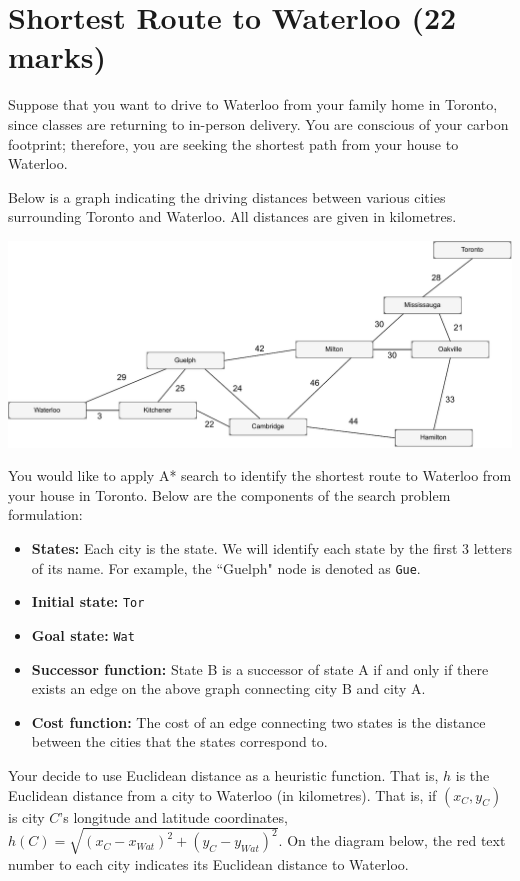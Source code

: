 \documentclass[12pt]{article}
\begin{document}
\newpage
\section{Shortest Route to Waterloo (22 marks)}

Suppose that you want to drive to Waterloo from your family home in Toronto, since classes are returning to in-person delivery. You are conscious of your carbon footprint; therefore, you are seeking the shortest path from your house to Waterloo.

Below is a graph indicating the driving distances between various cities surrounding Toronto and Waterloo. All distances are given in kilometres.

\includegraphics[width=\textwidth]{images_posted/Distance_map.pdf}

You would like to apply A* search to identify the shortest route to Waterloo from your house in Toronto. Below are the components of the search problem formulation:

\begin{itemize}
    \item \textbf{States:} Each city is the state. We will identify each state by the first 3 letters of its name. For example, the ``Guelph" node is denoted as \texttt{Gue}.
    \item \textbf{Initial state:} \texttt{Tor}
    \item \textbf{Goal state:} \texttt{Wat}
    \item \textbf{Successor function:} State B is a successor of state A if and only if there exists an edge on the above graph connecting city B and city A.
    \item \textbf{Cost function:} The cost of an edge connecting two states is the distance between the cities that the states correspond to.
\end{itemize}


Your decide to use Euclidean distance as a heuristic function. That is, $h$ is the Euclidean distance from a city to Waterloo (in kilometres). That is, if $(x_C,y_C)$ is city $C$'s longitude and latitude coordinates, $h(C) = \sqrt{(x_C - x_{Wat})^2 + (y_C - y_{Wat})^2}$. On the diagram below, the red text number to each city indicates its Euclidean distance to Waterloo.
\end{document}

